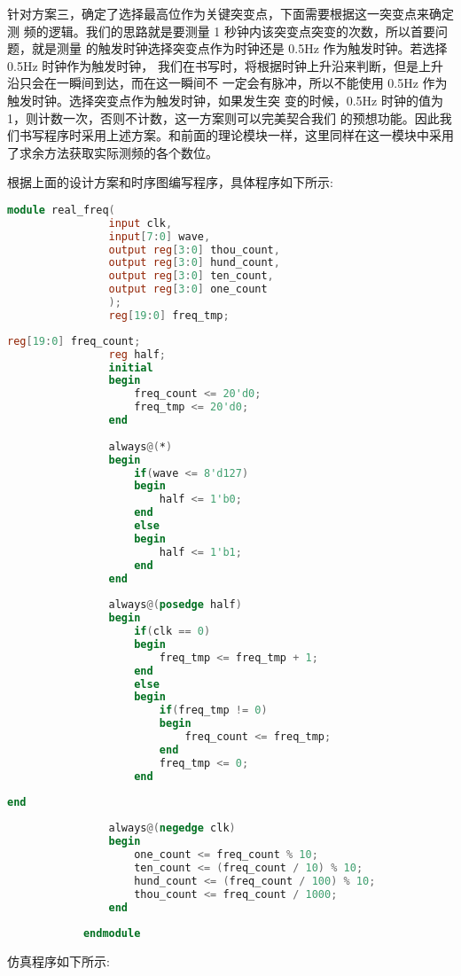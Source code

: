 {\begin{spacing}{1.5}
			针对方案三，确定了选择最高位作为关键突变点，下面需要根据这一突变点来确定测 频的逻辑。我们的思路就是要测量 1 秒钟内该突变点突变的次数，所以首要问题，就是测量 的触发时钟选择突变点作为时钟还是 0.5Hz 作为触发时钟。若选择 0.5Hz 时钟作为触发时钟， 我们在书写时，将根据时钟上升沿来判断，但是上升沿只会在一瞬间到达，而在这一瞬间不 一定会有脉冲，所以不能使用 0.5Hz 作为触发时钟。选择突变点作为触发时钟，如果发生突 变的时候，0.5Hz 时钟的值为 1，则计数一次，否则不计数，这一方案则可以完美契合我们 的预想功能。因此我们书写程序时采用上述方案。和前面的理论模块一样，这里同样在这一模块中采用了求余方法获取实际测频的各个数位。

			根据上面的设计方案和时序图编写程序，具体程序如下所示:
			\begin{lstlisting}[language=Verilog]
			module real_freq(
				input clk,
				input[7:0] wave,
				output reg[3:0] thou_count,
				output reg[3:0] hund_count,
				output reg[3:0] ten_count,
				output reg[3:0] one_count
				);
				reg[19:0] freq_tmp;
			\end{lstlisting}
			\begin{lstlisting}[language=Verilog]
				reg[19:0] freq_count;
				reg half;
				initial
				begin
					freq_count <= 20'd0;
					freq_tmp <= 20'd0;
				end
			
				always@(*)
				begin
					if(wave <= 8'd127)
					begin
						half <= 1'b0;
					end
					else
					begin
						half <= 1'b1;
					end
				end
			
				always@(posedge half)
				begin
					if(clk == 0)
					begin
						freq_tmp <= freq_tmp + 1;
					end
					else
					begin
						if(freq_tmp != 0)
						begin
							freq_count <= freq_tmp;
						end
						freq_tmp <= 0;
					end
			\end{lstlisting}
			\begin{lstlisting}[language=Verilog]
				end
			
				always@(negedge clk)
				begin
					one_count <= freq_count % 10;
					ten_count <= (freq_count / 10) % 10;
					hund_count <= (freq_count / 100) % 10;
					thou_count <= freq_count / 1000;
				end
			
			endmodule
			\end{lstlisting}

			仿真程序如下所示:


\end{spacing}}
